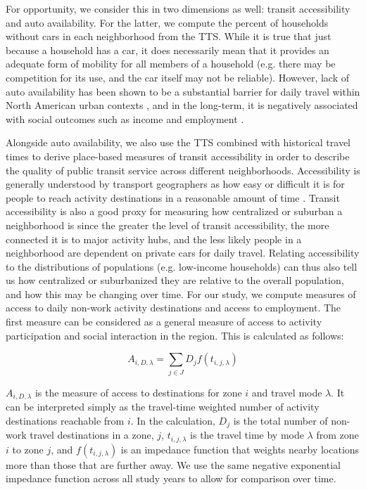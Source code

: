 For opportunity, we consider this in two dimensions as well: transit accessibility and auto availability. For the latter, we compute the percent of households without cars in each neighborhood from the TTS. While it is true that just because a household has a car, it does necessarily mean that it provides an adequate form of mobility for all members of a household (e.g. there may be competition for its use, and the car itself may not be reliable). However, lack of auto availability has been shown to be a substantial barrier for daily travel within North American urban contexts \cite{blumenberg_car-deficit_2018,allen_planning_2020}, and in the long-term, it is negatively associated with social outcomes such as income and employment \cite{blumenberg_driving_2014,smart_disentangling_2020}. 

Alongside auto availability, we also use the TTS combined with historical travel times to derive place-based measures of transit accessibility in order to describe the quality of public transit service across different neighborhoods. Accessibility is generally understood by transport geographers as how easy or difficult it is for people to reach activity destinations in a reasonable amount of time \cite{hansen_how_1959,geurs_accessibility_2004,el-geneidy_access_2006}. Transit accessibility is also a good proxy for measuring how centralized or suburban a neighborhood is since the greater the level of transit accessibility, the more connected it is to major activity hubs, and the less likely people in a neighborhood are dependent on private cars for daily travel. Relating accessibility to the distributions of populations (e.g. low-income households) can thus also tell us how centralized or suburbanized they are relative to the overall population, and how this may be changing over time. For our study, we compute measures of access to daily non-work activity destinations and access to employment. The first measure can be considered as a general measure of access to activity participation and social interaction in the region. This is calculated as follows:

\begin{equation}
A_{i,D,\lambda} = \sum_{j \in J} D_{j} f(t_{i,j,\lambda})
\end{equation}

$A_{i,D,\lambda}$ is the measure of access to destinations for zone $i$ and travel mode $\lambda$. It can be interpreted simply as the travel-time weighted number of activity destinations reachable from $i$. In the calculation, $D_j$ is the total number of non-work travel destinations in a zone, $j$, $t_{i,j,\lambda}$ is the travel time by mode $\lambda$ from zone $i$ to zone $j$, and $f(t_{i,j,\lambda})$ is an impedance function that weights nearby locations more than those that are further away. We use the same negative exponential impedance function across all study years to allow for comparison over time.

